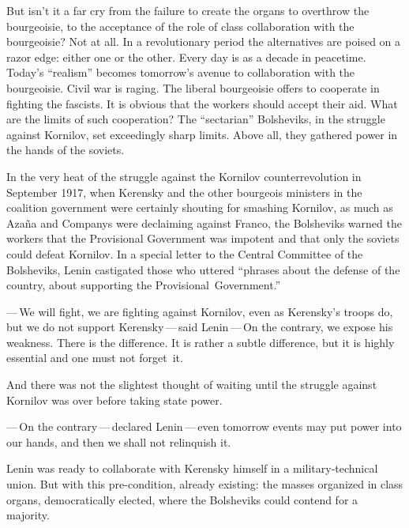 But isn’t it a far cry from the failure to create the organs to overthrow the bourgeoisie, to the acceptance of the role of class collaboration with the bourgeoisie? Not at all. In a revolutionary period the alternatives are poised on a razor edge: either one or the other. Every day is as a decade in peacetime. Today’s ``realism'' becomes tomorrow’s avenue to collaboration with the bourgeoisie. Civil war is raging. The liberal bourgeoisie offers to cooperate in fighting the fascists. It is obvious that the workers should accept their aid. What are the limits of such cooperation? The ``sectarian'' Bolsheviks, in the struggle against Kornilov, set exceedingly sharp limits. Above all, they gathered power in the hands of the soviets.
\nowidow

In the very heat of the struggle against the Kornilov counterrevolution in September 1917, when Kerensky and the other bourgeois ministers in the coalition government were certainly shouting for smashing Kornilov, as much as Azaña and Companys were declaiming against Franco, the Bolsheviks warned the workers that the Pro\-vi\-sion\-al Government was impotent and that only the soviets could defeat Kornilov. In a special letter to the Central Committee of the Bolsheviks, Lenin castigated those who uttered ``phrases about the defense of the country, about supporting the Provisional~Government.''

\medskip

—\,We will fight, we are fighting against Kornilov, even as Kerensky’s troops do, but we do not support Kerensky\,—\,said Lenin\,—\,On the contrary, we expose his weakness. There is the difference. It is rather a subtle difference, but it is highly essential and one must not forget~it.

\medskip

And there was not the slightest thought of waiting until the struggle against Kornilov was over before taking state power.

\medskip

—\,On the contrary\,—\,declared Lenin\,—\,even tomorrow events may put power into our hands, and then we shall not relinquish it.

\medskip

Lenin was ready to collaborate with Kerensky himself in a military-technical union. But with this pre-condition, already existing: the masses organized in class organs, democratically elected, where the Bolsheviks could contend for a majority.

